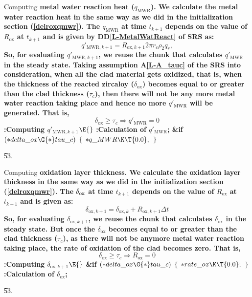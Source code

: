 \documentclass[letterpaper,12pt,baseclass=report]{cweb-hy}
\begin{document}
{
\fi

Computing \bf{metal water reaction heat ($q_{\mathrm{MWR}}$)}.
We calculate the metal water reaction heat in the same way as
we did in the initialization section (\ref{delroxqmwr}). The $q_{\mathrm{MWR}}$
at time $t_{k+1}$
depends on the value of $R_{\text{ox}}$ at $t_{k+1}$ and is given by
DD\ref{L-MetalWatReact} of SRS as:
\begin{equation}
q'_{\mathrm{MWR},k+1}= R_{\text{ox},k+1} 2\pi r_c  \rho_2 q_r,
\end{equation}
So, for evaluating $q'_{\mathrm{MWR},k+1}$, we reuse the chunk that calculates
$q'_{\mathrm{MWR}}$ in the steady state.
Taking assumption A\ref{L-A_tauc} of the SRS into consideration,
when all the clad material gets oxidized, that is, when the thickness of the
reacted zircaloy ($\delta_{\text{ox}}$) becomes equal to or greater than the
clad
thickness ($\tau_c$), then there will not be any more metal water reaction
taking place
and hence no more $q'_{\mathrm{MWR}}$ will be generated. That is,
\begin{equation}
\delta_{\text{ox}} \geq \tau_c \Rightarrow q'_{\text{MWR}}=0
\end{equation}
\Y\B\4:Computing $q'_{\mathrm{MWR},k+1}$\X${}\E{}$\6
:Calculation of $q'_{\mathrm{MWR}}$\X;\6
\&{if} ${}({*}\\{delta\_ox}\G{*}\\{tau\_c}){}$\5
${}\{{}$\1\6
${}{*}\\{q\_MWR}\K\T{0.0};{}$\6
\4${}\}{}$\2\par
\U53.\fi

\fi

Computing \bf{oxidation layer thickness}.
We calculate the oxidation layer thickness in the same way as
we did in the initialization section (\ref{delroxqmwr}). The $\delta_{%
\mathrm{ox}}$
at time $t_{k+1}$
depends on the value of $R_{\text{ox}}$ at $t_{k+1}$ and is given as:
\begin{equation}
\delta_{\text{ox},k+1}=\delta_{\text{ox},k}+R_{\text{ox},k+1}\Delta t
\end{equation}
So, for evaluating $\delta_{\text{ox},k+1}$, we reuse the chunk that calculates
$\delta_{\text{ox}}$ in the steady state.
But once the $\delta_{\text{ox}}$ becomes equal to or greater than the clad
thickness ($\tau_c$), as there will not be anymore metal water reaction taking
place, the rate of oxidation of the clad becomes zero. That is,
\begin{equation}
\delta_{\text{ox}} \geq \tau_c \Rightarrow R_{\text{ox}}=0
\end{equation}
\Y\B\4:Computing $\delta_{\mathrm{ox},k+1}$\X${}\E{}$\6
\&{if} ${}({*}\\{delta\_ox}\G{*}\\{tau\_c}){}$\5
${}\{{}$\1\6
${}{*}\\{rate\_ox}\K\T{0.0};{}$\6
\4${}\}{}$\2\6
:Calculation of $\delta_{\text{ox}}$\X;\par
\U53.\fi

}
\end{document}
